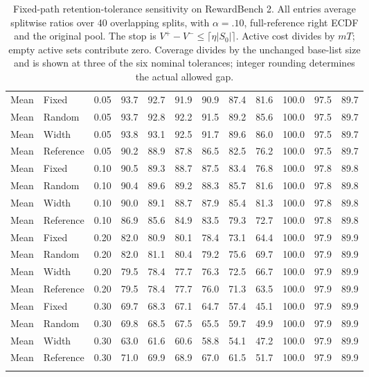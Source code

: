 \begin{table}[t]
\begin{tabular}{llrrrrrrrrrr}
\midrule
Mean & Fixed & 0.05 & 93.7 & 92.7 & 91.9 & 90.9 & 87.4 & 81.6 & 100.0 & 97.5 & 89.7 \\
Mean & Random & 0.05 & 93.7 & 92.8 & 92.2 & 91.5 & 89.2 & 85.6 & 100.0 & 97.5 & 89.7 \\
Mean & Width & 0.05 & 93.8 & 93.1 & 92.5 & 91.7 & 89.6 & 86.0 & 100.0 & 97.5 & 89.7 \\
Mean & Reference & 0.05 & 90.2 & 88.9 & 87.8 & 86.5 & 82.5 & 76.2 & 100.0 & 97.5 & 89.7 \\
\addlinespace
Mean & Fixed & 0.10 & 90.5 & 89.3 & 88.7 & 87.5 & 83.4 & 76.8 & 100.0 & 97.8 & 89.8 \\
Mean & Random & 0.10 & 90.4 & 89.6 & 89.2 & 88.3 & 85.7 & 81.6 & 100.0 & 97.8 & 89.8 \\
Mean & Width & 0.10 & 90.0 & 89.1 & 88.7 & 87.9 & 85.4 & 81.3 & 100.0 & 97.8 & 89.8 \\
Mean & Reference & 0.10 & 86.9 & 85.6 & 84.9 & 83.5 & 79.3 & 72.7 & 100.0 & 97.8 & 89.8 \\
\addlinespace
Mean & Fixed & 0.20 & 82.0 & 80.9 & 80.1 & 78.4 & 73.1 & 64.4 & 100.0 & 97.9 & 89.9 \\
Mean & Random & 0.20 & 82.0 & 81.1 & 80.4 & 79.2 & 75.6 & 69.7 & 100.0 & 97.9 & 89.9 \\
Mean & Width & 0.20 & 79.5 & 78.4 & 77.7 & 76.3 & 72.5 & 66.7 & 100.0 & 97.9 & 89.9 \\
Mean & Reference & 0.20 & 79.5 & 78.4 & 77.7 & 76.0 & 71.3 & 63.5 & 100.0 & 97.9 & 89.9 \\
\addlinespace
Mean & Fixed & 0.30 & 69.7 & 68.3 & 67.1 & 64.7 & 57.4 & 45.1 & 100.0 & 97.9 & 89.9 \\
Mean & Random & 0.30 & 69.8 & 68.5 & 67.5 & 65.5 & 59.7 & 49.9 & 100.0 & 97.9 & 89.9 \\
Mean & Width & 0.30 & 63.0 & 61.6 & 60.6 & 58.8 & 54.1 & 47.2 & 100.0 & 97.9 & 89.9 \\
Mean & Reference & 0.30 & 71.0 & 69.9 & 68.9 & 67.0 & 61.5 & 51.7 & 100.0 & 97.9 & 89.9 \\
\addlinespace
\bottomrule
\end{tabular}
\caption{Fixed-path retention-tolerance sensitivity on RewardBench 2. All entries average splitwise ratios over 40 overlapping splits, with $\alpha=.10$, full-reference right ECDF and the original pool. The stop is $V^+-V^-\le\lceil\eta|S_0|\rceil$. Active cost divides by $mT$; empty active sets contribute zero. Coverage divides by the unchanged base-list size and is shown at three of the six nominal tolerances; integer rounding determines the actual allowed gap.}
\label{tab:tolerance-all-0}
\end{table}

